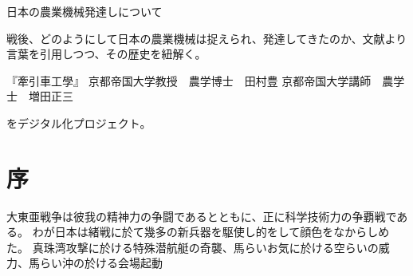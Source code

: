 日本の農業機械発達しについて

戦後、どのようにして日本の農業機械は捉えられ、発達してきたのか、文献より言葉を引用しつつ、その歴史を紐解く。

『牽引車工學』
京都帝国大学教授　農学博士　田村豊
京都帝国大学講師　農学士　増田正三

をデジタル化プロジェクト。

\section{序}
大東亜戦争は彼我の精神力の争闘であるとともに、正に科学技術力の争覇戦である。
わが日本は緒戦に於て幾多の新兵器を駆使し的をして顔色をなからしめた。
真珠湾攻撃に於ける特殊潜航艇の奇襲、馬らいお気に於ける空らいの威力、馬らい沖の於ける会場起動
